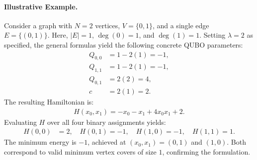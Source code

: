 \documentclass[12pt]{article}
\begin{document}
\paragraph{Illustrative Example.}
Consider a graph with $N = 2$ vertices, $V = \{0, 1\}$, and a single edge $E = \{(0, 1)\}$. Here, $|E| = 1$, $\deg(0) = 1$, and $\deg(1) = 1$. Setting $\lambda = 2$ as specified, the general formulas yield the following concrete QUBO parameters:
\begin{align}
Q_{0,0} &= 1 - 2(1) = -1, \\
Q_{1,1} &= 1 - 2(1) = -1, \\
Q_{0,1} &= 2(2) = 4, \\
c &= 2(1) = 2.
\end{align}
The resulting Hamiltonian is:
\begin{align}
H(x_0, x_1) = -x_0 - x_1 + 4x_0 x_1 + 2.
\end{align}
Evaluating $H$ over all four binary assignments yields:
\begin{align}
H(0,0) &= 2, \quad H(0,1) = -1, \quad H(1,0) = -1, \quad H(1,1) = 1.
\end{align}
The minimum energy is $-1$, achieved at $(x_0, x_1) = (0, 1)$ and $(1, 0)$. Both correspond to valid minimum vertex covers of size $1$, confirming the formulation.
\end{document}
